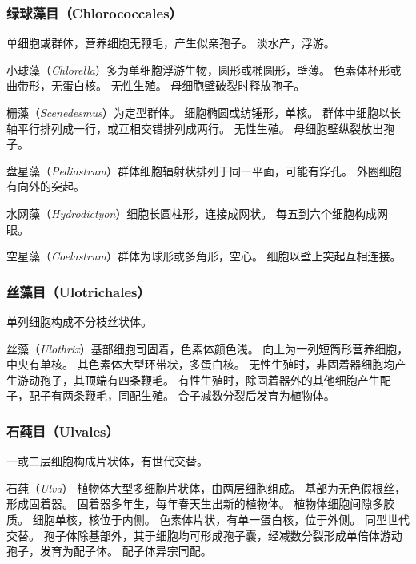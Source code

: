 \documentclass[11pt]{article}
\begin{document}
\subsubsection{绿球藻目（Chlorococcales）}
单细胞或群体，营养细胞无鞭毛，产生似亲孢子。
淡水产，浮游。

\par

小球藻（\textit{Chlorella}）多为单细胞浮游生物，圆形或椭圆形，壁薄。
色素体杯形或曲带形，无蛋白核。
无性生殖。
母细胞壁破裂时释放孢子。

\par

栅藻（\textit{Scenedesmus}）为定型群体。
细胞椭圆或纺锤形，单核。
群体中细胞以长轴平行排列成一行，或互相交错排列成两行。
无性生殖。
母细胞壁纵裂放出孢子。

\par

盘星藻（\textit{Pediastrum}）群体细胞辐射状排列于同一平面，可能有穿孔。
外圈细胞有向外的突起。

\par

水网藻（\textit{Hydrodictyon}）细胞长圆柱形，连接成网状。
每五到六个细胞构成网眼。

\par

空星藻（\textit{Coelastrum}）群体为球形或多角形，空心。
细胞以壁上突起互相连接。

\subsubsection{丝藻目（Ulotrichales）}
单列细胞构成不分枝丝状体。

\par

丝藻（\textit{Ulothrix}）基部细胞司固着，色素体颜色浅。
向上为一列短筒形营养细胞，中央有单核。
其色素体大型环带状，多蛋白核。
无性生殖时，非固着器细胞均产生游动孢子，其顶端有四条鞭毛。
有性生殖时，除固着器外的其他细胞产生配子，配子有两条鞭毛，同配生殖。
合子减数分裂后发育为植物体。

\subsubsection{石莼目（Ulvales）}
一或二层细胞构成片状体，有世代交替。

\par

石莼（\textit{Ulva}）
植物体大型多细胞片状体，由两层细胞组成。
基部为无色假根丝，形成固着器。
固着器多年生，每年春天生出新的植物体。
植物体细胞间隙多胶质。
细胞单核，核位于内侧。
色素体片状，有单一蛋白核，位于外侧。
同型世代交替。
孢子体除基部外，其于细胞均可形成孢子囊，经减数分裂形成单倍体游动孢子，发育为配子体。
配子体异宗同配。
\end{document}
